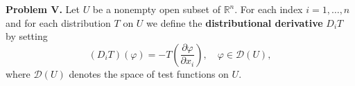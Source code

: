 \textbf{Problem V.} Let $U$ be a nonempty open subset of $\mathbb{R}^n$. For each index $i = 1, \ldots, n$ and for each distribution $T$ on $U$ we define the \textbf{distributional derivative} $D_i T$ by setting
$$(D_i T)(\varphi) = -T\left(\frac{\partial \varphi}{\partial x_i}\right), \quad \varphi \in \mathcal{D}(U),$$
where $\mathcal{D}(U)$ denotes the space of test functions on $U$.
